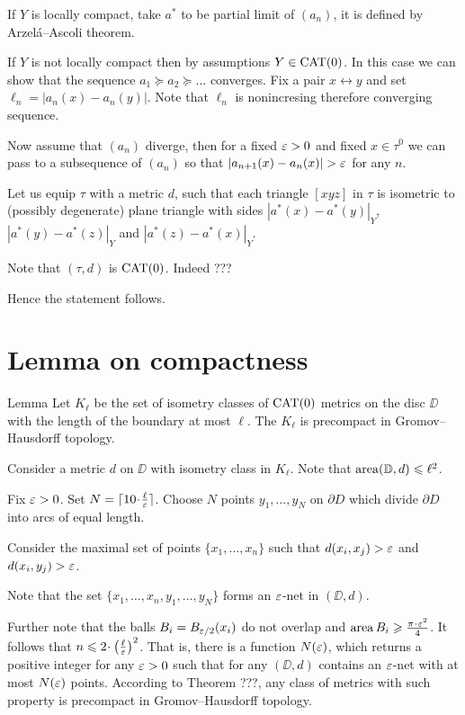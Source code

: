 \documentclass[a4paper,10pt]{amsart}
\begin{document}
If $Y$ is locally compact, 
take $a^*$ to be partial limit of $(a_n)$,
it is defined by Arzel\'a--Ascoli theorem.

If $Y$ is not locally compact then by assumptions $Y\in\mathop{\rm CAT}\nolimits(0)$.
In this case we can show that the sequence $a_1\succcurlyeq a_2\succcurlyeq\dots $ converges.
Fix a pair $x\leftrightarrow y$ and set $\ell_n=|a_n(x)-a_n(y)|$.
Note that $\ell_n$ is nonincresing therefore converging sequence.

Now assume that $(a_n)$ diverge,
then for a fixed $\varepsilon>0$ and fixed  $x\in\tau^{0}$
we can pass to a subsequence of $(a_n)$ so that
$|a_{n+1}(x)-a_{n}(x)|>\eps$ for any $n$.

Let us equip $\tau$ with a metric $d$,
such that each triangle $[xyz]$ in $\tau$ is isometric to (possibly degenerate) plane triangle with sides $|a^*(x)-a^*(y)|_Y$,
$|a^*(y)-a^*(z)|_Y$ and  $|a^*(z)-a^*(x)|_Y$.

Note that $(\tau,d)$ is $\mathop{\rm CAT}\nolimits(0)$.
Indeed ???

Hence the statement follows.
\qeds



\section{Lemma on compactness}

\begin{thm}{Lemma}
Let $K_\ell$ be the set of isometry classes of $\mathop{\rm CAT}\nolimits(0)$ metrics on the disc $\DD$ with the length of the boundary at most $\ell$.
The $K_\ell$ is precompact in Gromov--Hausdorff topology.
\end{thm}

Consider a metric $d$ on $\DD$ with isometry class in $K_\ell$.
Note that $\mathop{\rm area}\nolimits (\mathbb{D},d)\leqslant \ell^2$.

Fix $\varepsilon>0$. 
Set $N=\lceil 10\cdot\tfrac\ell\eps\rceil$.
Choose $N$ points $y_1,\dots,y_N$ on $\partial D$
which divide $\partial D$ into arcs of equal length.

Consider the maximal set of points $\{x_1,\dots,x_n\}$ such that $d(x_i,x_j)>\varepsilon$ and $d(x_i,y_j)>\varepsilon$.

Note that the set $\{x_1,\dots,x_n,y_1,\dots,y_N\}$
forms an $\varepsilon$-net in $(\DD,d)$.

Further note that the balls $B_i=B_{\varepsilon/2}(x_i)$
do not overlap and $\area B_i\ge \tfrac{\pi\cdot\eps^2}{4}$.
It follows that $n\le 2\cdot\left(\tfrac\ell\eps\right)^2$.
That is, there is a function $N(\varepsilon)$,
which returns a positive integer for any $\varepsilon>0$
such that for any 
$(\DD,d)$ contains an $\varepsilon$-net
with at most $N(\varepsilon)$ points.
According to Theorem ???, 
any class of metrics with such property is precompact in Gromov--Hausdorff topology.
\qeds
\end{document}
